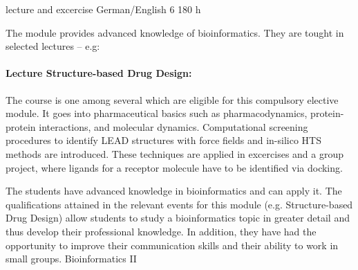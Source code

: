 {lecture and excercise}
{German/English}
{6}
{180 h}
{The module provides advanced knowledge of bioinformatics. They are tought in selected lectures -- e.g:
\paragraph{Lecture Structure-based Drug Design:} The course is one among several which are eligible for this compulsory elective module. It goes into pharmaceutical basics such as pharmacodynamics, protein-protein interactions, and molecular dynamics. Computational screening procedures to identify LEAD structures with force fields and in-silico HTS methods are introduced. These techniques are applied in excercises and a group project, where ligands for a receptor molecule have to be identified via docking.}
{The students have advanced knowledge in bioinformatics and can apply it. The qualifications attained in the relevant events for this module (e.g. Structure-based Drug Design) allow students to study a bioinformatics topic in greater detail and thus develop their professional knowledge. In addition, they have had the opportunity to improve their communication skills and their ability to work in small groups.}
{Bioinformatics II}